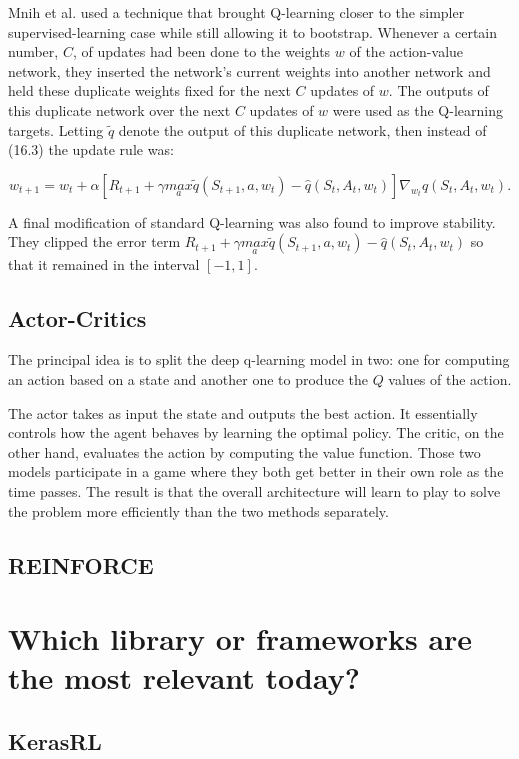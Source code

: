 \documentclass[letterpaper, 10 pt]{IEEEconf}
\begin{document}
Mnih et al. used a technique that brought Q-learning closer to the
simpler supervised-learning case while still allowing it to
bootstrap. Whenever a certain number, $C$, of updates had been done to
the weights $w$ of the action-value network, they inserted the
network’s current weights into another network and held these
duplicate weights fixed for the next $C$ updates of $w$. The outputs
of this duplicate network over the next $C$ updates of $w$ were used
as the Q-learning targets. Letting $\tilde{q}$ denote the output of
this duplicate network, then instead of (16.3) the update rule was:

$$
	w_{t+1}=w_t+\alpha[R_{t+1}+\gamma \underset{a}{max} \tilde{q}(S_{t+1},a,w_t)-\hat{q}(S_t,A_t,w_t)]\nabla_{w_t}\hat{q}(S_t,A_t,w_t).
$$

A final modification of standard Q-learning was also found to improve stability. They clipped the error term $R_{t+1}+\gamma \underset{a}{max} \tilde{q}\left(S_{t+1},a,w_t\right)-\hat{q}\left(S_t,A_t,w_t\right)$ so that it remained in the interval $\left[-1,1\right]$.

\subsection{Actor-Critics}

The principal idea is to split the deep q-learning model in two: one for computing an
action based on a state and another one to produce the $Q$ values of the
action.

The actor takes as input the state and outputs the best action. It
essentially controls how the agent behaves by learning the optimal
policy. The critic, on the other hand, evaluates the action by
computing the value function. Those two models participate in a game
where they both get better in their own role as the time passes. The
result is that the overall architecture will learn to play to solve
the problem more efficiently than the two methods separately.

\subsection{REINFORCE}

\section{Which library or frameworks are the most relevant today?}

\subsection{KerasRL}
\end{document}

